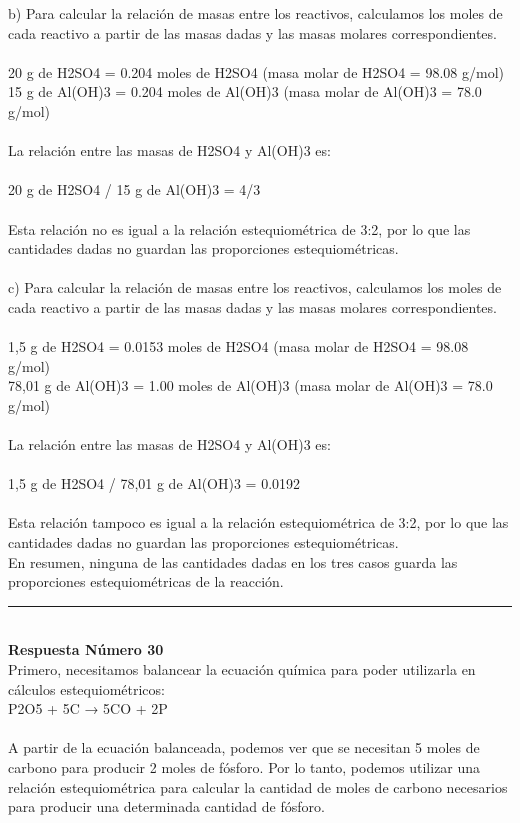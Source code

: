 \documentclass{article}
\begin{document}
b) Para calcular la relación de masas entre los reactivos, calculamos los moles de cada reactivo a partir de las masas dadas y las masas molares correspondientes.\\
\\
20 g de H2SO4 = 0.204 moles de H2SO4 (masa molar de H2SO4 = 98.08 g/mol)\\
15 g de Al(OH)3 = 0.204 moles de Al(OH)3 (masa molar de Al(OH)3 = 78.0 g/mol)\\
\\
La relación entre las masas de H2SO4 y Al(OH)3 es:\\
\\
20 g de H2SO4 / 15 g de Al(OH)3 = 4/3\\
\\
Esta relación no es igual a la relación estequiométrica de 3:2, por lo que las cantidades dadas no guardan las proporciones estequiométricas.\\
\\
c) Para calcular la relación de masas entre los reactivos, calculamos los moles de cada reactivo a partir de las masas dadas y las masas molares correspondientes.\\
\\
1,5 g de H2SO4 = 0.0153 moles de H2SO4 (masa molar de H2SO4 = 98.08 g/mol)\\
78,01 g de Al(OH)3 = 1.00 moles de Al(OH)3 (masa molar de Al(OH)3 = 78.0 g/mol)\\
\\
La relación entre las masas de H2SO4 y Al(OH)3 es:\\
\\
1,5 g de H2SO4 / 78,01 g de Al(OH)3 = 0.0192\\
\\
Esta relación tampoco es igual a la relación estequiométrica de 3:2, por lo que las cantidades dadas no guardan las proporciones estequiométricas.\\
En resumen, ninguna de las cantidades dadas en los tres casos guarda las proporciones estequiométricas de la reacción.\\
\noindent\rule{\textwidth}{1pt} \\
\textbf{Respuesta Número 30} \\
Primero, necesitamos balancear la ecuación química para poder utilizarla en cálculos estequiométricos:\\
P2O5 + 5C → 5CO + 2P\\
\\
A partir de la ecuación balanceada, podemos ver que se necesitan 5 moles de carbono para producir 2 moles de fósforo. Por lo tanto, podemos utilizar una relación estequiométrica para calcular la cantidad de moles de carbono necesarios para producir una determinada cantidad de fósforo.\\
\end{document}

